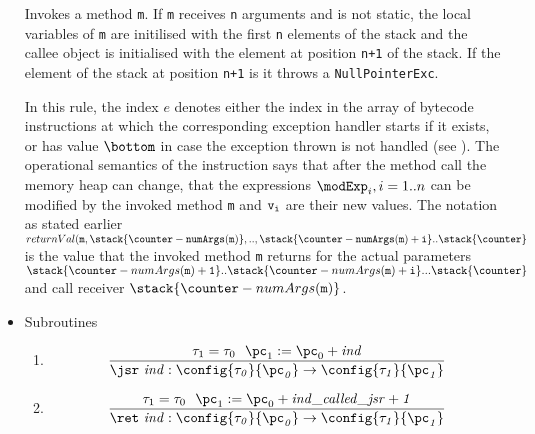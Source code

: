 \begin{itemize}
		  Invokes a method \texttt{m}. If \texttt{m} receives \texttt{n} arguments and is not static, 
		  the local variables of \texttt{m} are initilised with the first \texttt{n} elements of the stack
		  and the callee object is initialised with the element at position \texttt{n+1} of the stack.
		  If the element of the stack at position \texttt{n+1} is \Mynull it throws a \texttt{NullPointerExc}.

	
	
In this rule, the index $e$ denotes either the index in the array of bytecode instructions at which the corresponding exception handler starts if it exists, 
or has value $\bottom$ in case the exception thrown is not handled (see \cite{VMSpec} ). 
The operational semantics of the   instruction  says that after the method call 
the memory heap can change,	
that the expressions $\texttt{\modExp}_i, i = 1 .. n $ can be  modified by the invoked method \texttt{m} and $\tt{v_i}$ are their new values.  
The notation as stated earlier \\
$ returnVal( \tt{m,\stack{\counter - numArgs(\tt{m})},..,\stack{\counter - numArgs(\tt{m})+i} ..\stack{\counter} }$ is the value that the invoked method \texttt{m}
returns for  the actual parameters $\stack{\counter - numArgs(\tt{m}) + 1} ..  \stack{\counter - numArgs(\tt{m}) + i}...\stack{\counter}  $ and call receiver
$\stack{\counter - numArgs(\tt{m}) }$.   

    \item Subroutines 
	\begin{enumerate}		
         \item     $$  \frac{ \tau_{1} = \tau_{0} \ \     \pc_1 :=  \pc_0  + \it{ind} } 
{\jsr \ \it{ind} :\config{\tau_{0}}{\pc_0} \rightarrow \config{\tau_{1}}{\pc_1}} $$
	
	\item  $$  \frac{ \tau_{1} = \tau_{0} \ \     \pc_1 :=  \pc_0  + \it{ind\_called\_jsr } + 1  }  
		{\ret \ \it{ind} :\config{\tau_{0}}{\pc_0} \rightarrow \config{\tau_{1}}{\pc_1}}  $$

	\end{enumerate}
\end{itemize}
